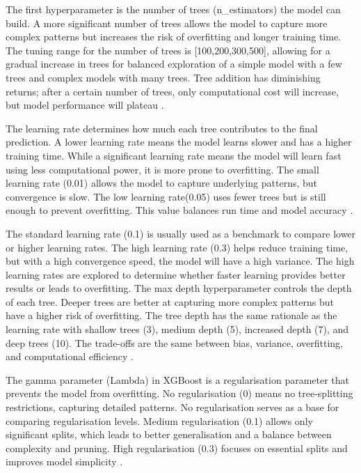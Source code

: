 \documentclass[mstat,12pt]{unswthesis}
\begin{document}
The first hyperparameter is the number of trees (n\_estimators) the
model can build. A more significant number of trees allows the model to
capture more complex patterns but increases the risk of overfitting and
longer training time. The tuning range for the number of trees is
{[}100,200,300,500{]}, allowing for a gradual increase in trees for
balanced exploration of a simple model with a few trees and complex
models with many trees. Tree addition has diminishing returns; after a
certain number of trees, only computational cost will increase, but
model performance will plateau \cite{a2022_xgboost}.

The learning rate determines how much each tree contributes to the final
prediction. A lower learning rate means the model learns slower and has
a higher training time. While a significant learning rate means the
model will learn fast using less computational power, it is more prone
to overfitting. The small learning rate (0.01) allows the model to
capture underlying patterns, but convergence is slow. The low learning
rate(0.05) uses fewer trees but is still enough to prevent overfitting.
This value balances run time and model accuracy \cite{a2022_xgboost}.

The standard learning rate (0.1) is usually used as a benchmark to
compare lower or higher learning rates. The high learning rate (0.3)
helps reduce training time, but with a high convergence speed, the model
will have a high variance. The high learning rates are explored to
determine whether faster learning provides better results or leads to
overfitting. The max depth hyperparameter controls the depth of each
tree. Deeper trees are better at capturing more complex patterns but
have a higher risk of overfitting. The tree depth has the same rationale
as the learning rate with shallow trees (3), medium depth (5), increased
depth (7), and deep trees (10). The trade-offs are the same between
bias, variance, overfitting, and computational efficiency
\cite{a2022_xgboost}.

The gamma parameter (Lambda) in XGBoost is a regularisation parameter
that prevents the model from overfitting. No regularisation (0) means no
tree-splitting restrictions, capturing detailed patterns. No
regularisation serves as a base for comparing regularisation levels.
Medium regularisation (0.1) allows only significant splits, which leads
to better generalisation and a balance between complexity and pruning.
High regularisation (0.3) focuses on essential splits and improves model
simplicity \cite{a2022_xgboost}.
\end{document}
